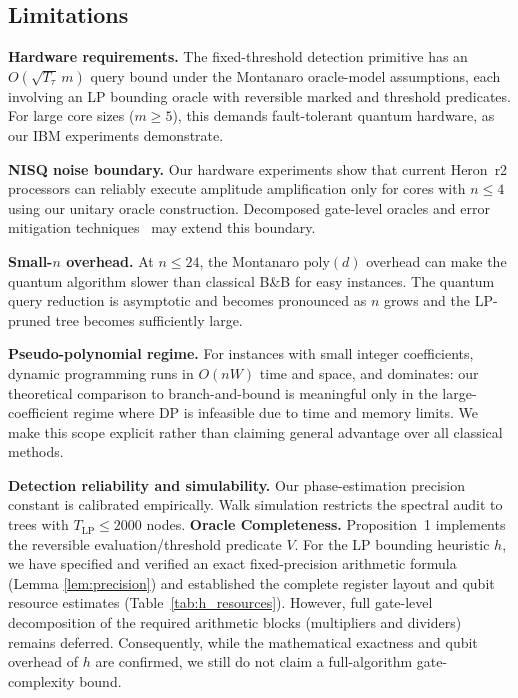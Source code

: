 \documentclass[conference]{IEEEtran} \IEEEoverridecommandlockouts
\begin{document}
\subsection{Limitations}

\textbf{Hardware requirements.} The fixed-threshold detection primitive has an $O(\sqrt{T_{\tau}}\,m)$ query bound under the Montanaro oracle-model assumptions, each involving an LP bounding oracle with reversible marked and threshold predicates. For large core sizes ($m \geq 5$), this demands fault-tolerant quantum hardware, as our IBM experiments demonstrate.

\textbf{NISQ noise boundary.} Our hardware experiments show that current Heron~r2 processors can reliably execute amplitude amplification only for cores with $n \leq 4$ using our unitary oracle construction. Decomposed gate-level oracles and error mitigation techniques~\cite{ref31} may extend this boundary.

\textbf{Small-$n$ overhead.} At $n \leq 24$, the Montanaro $\text{poly}(d)$ overhead can make the quantum algorithm slower than classical B\&B for easy instances. The quantum query reduction is asymptotic and becomes pronounced as $n$ grows and the LP-pruned tree becomes sufficiently large.

\textbf{Pseudo-polynomial regime.} For instances with small integer coefficients, dynamic programming runs in $O(nW)$ time and space, and dominates: our theoretical comparison to branch-and-bound is meaningful only in the large-coefficient regime where DP is infeasible due to time and memory limits. We make this scope explicit rather than claiming general advantage over all classical methods.

\textbf{Detection reliability and simulability.} Our phase-estimation precision constant is calibrated empirically. Walk simulation restricts the spectral audit to trees with $T_{\text{LP}} \le 2000$ nodes. \textbf{Oracle Completeness.} Proposition~1 implements the reversible evaluation/threshold predicate $V$. For the LP bounding heuristic $h$, we have specified and verified an exact fixed-precision arithmetic formula (Lemma \ref{lem:precision}) and established the complete register layout and qubit resource estimates (Table~\ref{tab:h_resources}). However, full gate-level decomposition of the required arithmetic blocks (multipliers and dividers) remains deferred. Consequently, while the mathematical exactness and qubit overhead of $h$ are confirmed, we still do not claim a full-algorithm gate-complexity bound.
\end{document}
